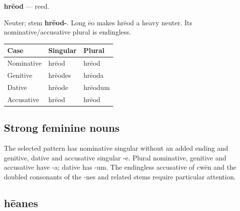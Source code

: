\par\begin{minipage}{\linewidth}\raggedright
\textbf{hrēod} — reed.

Neuter; stem \textbf{hrēod-}. Long ēo makes hrēod a heavy neuter. Its nominative/\allowbreak{}accusative plural is endingless.

\par\begingroup
\fontsize{10.5}{13.2}\selectfont
\setlength{\LTleft}{0pt}\setlength{\LTright}{\fill}
\noindent
\begin{tabular}{@{}>{\raggedright\arraybackslash}p{39.46mm}>{\raggedright\arraybackslash}p{39.46mm}>{\raggedright\arraybackslash}p{39.46mm}@{}}
\toprule
\textbf{Case} & \textbf{Singular} & \textbf{Plural} \\
\midrule
Nominative & hrēod & hrēod \\
Genitive & hrēodes & hrēoda \\
Dative & hrēode & hrēodum \\
Accusative & hrēod & hrēod \\
\bottomrule
\end{tabular}
\par\endgroup

\end{minipage}\par
{}
\subsection*{Strong feminine nouns}

The selected pattern has nominative singular without an added ending and genitive, dative and accusative singular -e. Plural nominative, genitive and accusative have -a; dative has -um. The endingless accusative of cwēn and the doubled consonants of the -nes and related stems require particular attention.

\subsection*{hēanes}

